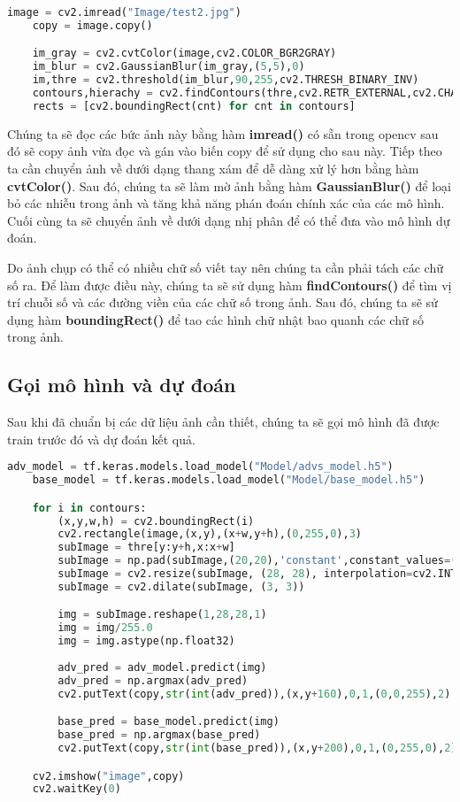 \begin{lstlisting}[language = Python]
    image = cv2.imread("Image/test2.jpg")
    copy = image.copy()

    im_gray = cv2.cvtColor(image,cv2.COLOR_BGR2GRAY)
    im_blur = cv2.GaussianBlur(im_gray,(5,5),0)
    im,thre = cv2.threshold(im_blur,90,255,cv2.THRESH_BINARY_INV)
    contours,hierachy = cv2.findContours(thre,cv2.RETR_EXTERNAL,cv2.CHAIN_APPROX_SIMPLE)
    rects = [cv2.boundingRect(cnt) for cnt in contours]

\end{lstlisting}

Chúng ta sẽ đọc các bức ảnh này bằng hàm \textbf{imread()} có sẵn trong opencv sau đó sẽ copy ảnh vừa đọc và gán vào biến copy để sử dụng cho sau này.
Tiếp theo ta cần chuyển ảnh về dưới dạng thang xám để dễ dàng xử lý hơn bằng hàm \textbf{cvtColor()}.
Sau đó, chúng ta sẽ làm mờ ảnh bằng hàm \textbf{GaussianBlur()} để loại bỏ các nhiễu trong ảnh và tăng khả năng phán đoán chính xác của các mô hình.
Cuối cùng ta sẽ chuyển ảnh về dưới dạng nhị phân để có thể đưa vào mô hình dự đoán.

Do ảnh chụp có thể có nhiều chữ số viết tay nên chúng ta cần phải tách các chữ số ra. Để làm được điều này, chúng ta sẽ sử dụng hàm \textbf{findContours()} 
để tìm vị trí chuỗi số và các đường viền của các chữ số trong ảnh. Sau đó, chúng ta sẽ sử dụng hàm \textbf{boundingRect()} để tao các hình chữ nhật bao quanh các chữ số trong ảnh.

\subsection{Gọi mô hình và dự đoán}

Sau khi đã chuẩn bị các dữ liệu ảnh cần thiết, chúng ta sẽ gọi mô hình đã được train trước đó và dự đoán kết quả.

\begin{lstlisting}[language = Python]
    adv_model = tf.keras.models.load_model("Model/advs_model.h5")
    base_model = tf.keras.models.load_model("Model/base_model.h5")

    for i in contours:
        (x,y,w,h) = cv2.boundingRect(i)
        cv2.rectangle(image,(x,y),(x+w,y+h),(0,255,0),3)
        subImage = thre[y:y+h,x:x+w]
        subImage = np.pad(subImage,(20,20),'constant',constant_values=(0,0))
        subImage = cv2.resize(subImage, (28, 28), interpolation=cv2.INTER_AREA)
        subImage = cv2.dilate(subImage, (3, 3))

        img = subImage.reshape(1,28,28,1)
        img = img/255.0
        img = img.astype(np.float32)
        
        adv_pred = adv_model.predict(img)
        adv_pred = np.argmax(adv_pred)
        cv2.putText(copy,str(int(adv_pred)),(x,y+160),0,1,(0,0,255),2)

        base_pred = base_model.predict(img)
        base_pred = np.argmax(base_pred)
        cv2.putText(copy,str(int(base_pred)),(x,y+200),0,1,(0,255,0),2)

    cv2.imshow("image",copy)
    cv2.waitKey(0)


\end{lstlisting}

